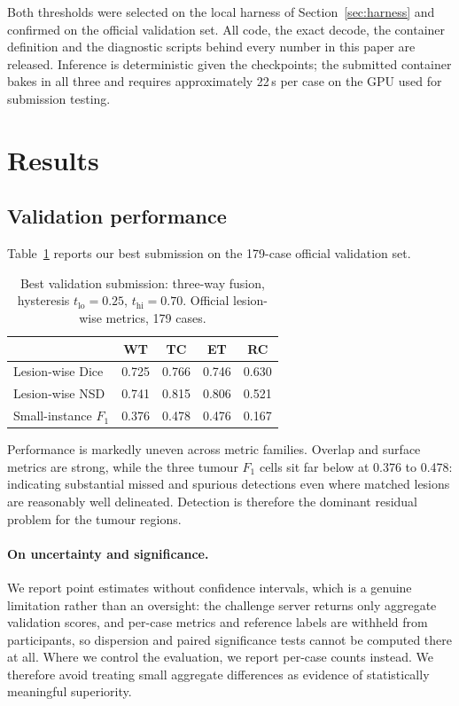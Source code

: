 \documentclass[runningheads]{llncs}
\begin{document}
Both thresholds were selected on the local harness of Section~\ref{sec:harness} and confirmed on
the official validation set. All code, the exact decode, the container definition and the
diagnostic scripts behind every number in this paper are released. Inference is deterministic
given the checkpoints; the submitted container bakes in all three and requires approximately
22\,s per case on the GPU used for submission testing.

\section{Results}
\label{sec:results}

\subsection{Validation performance}

Table~\ref{tab:final} reports our best submission on the 179-case official validation set.

\begin{table}[t]
\centering
\caption{Best validation submission: three-way fusion, hysteresis $t_{\mathrm{lo}}=0.25$, $t_{\mathrm{hi}}=0.70$.
Official lesion-wise metrics, 179 cases.}
\label{tab:final}
\begin{tabular}{@{}lcccc@{}}
\toprule
 & WT & TC & ET & RC \\
\midrule
Lesion-wise Dice     & 0.725 & 0.766 & 0.746 & 0.630 \\
Lesion-wise NSD      & 0.741 & 0.815 & 0.806 & 0.521 \\
Small-instance $F_1$ & 0.376 & 0.478 & 0.476 & 0.167 \\
\bottomrule
\end{tabular}
\end{table}

Performance is markedly uneven across metric families. Overlap and surface metrics are strong,
while the three tumour $F_1$ cells sit far below at 0.376 to 0.478: indicating substantial missed and spurious detections even where matched lesions are reasonably
well delineated. Detection is therefore the dominant residual problem for the tumour regions.

\paragraph{On uncertainty and significance.} We report point estimates without confidence
intervals, which is a genuine limitation rather than an oversight: the challenge server returns
only aggregate validation scores, and per-case metrics and reference labels are withheld from
participants, so dispersion and paired significance tests cannot be computed there at all. Where we control the evaluation, we report per-case counts instead. We therefore avoid treating
small aggregate differences as evidence of statistically meaningful superiority.
\end{document}
